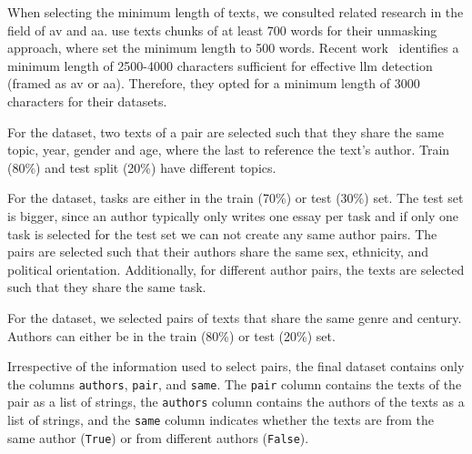 When selecting the minimum length of texts, we consulted related research in the field of \ac{av} and \ac{aa}.
\citet{bevendorff_generalizing_2019} use texts chunks of at least 700 words for their unmasking approach, 
where \citet{koppel_authorship_2004} set the minimum length to 500 words.
Recent work~\citep{llm_detection_av_2025} identifies a minimum length of \num{2500}-\num{4000} characters 
sufficient for effective \ac{llm} detection (framed as \ac{av} or \ac{aa}).
Therefore, they opted for a minimum length of \num{3000} characters for their datasets.

\begin{table}[h]
\centering\small
\caption{Statistics of preprocessed datasets \dataPan{}, \dataBlog{}, \dataGutenberg{}, and \dataStudent{}.}
\label{tab:data_stats}
\end{table}

For the \dataBlog{} dataset, 
two texts of a pair are selected such that they share the same topic, year, gender and age, where the last to reference the text's author.
Train (80\%) and test split (20\%) have different topics.

For the \dataStudent{} dataset,
tasks are either in the train (70\%) or test (30\%) set.
The test set is bigger, since an author typically only writes one essay per task and if only one task is selected for the test set we can not create any same author pairs.
The pairs are selected such that their authors share the same sex, ethnicity, and political orientation.
Additionally, for different author pairs, the texts are selected such that they share the same task.

For the \dataGutenberg{} dataset,
we selected pairs of texts that share the same genre and century.
Authors can either be in the train (80\%) or test (20\%) set.

Irrespective of the information used to select pairs, the final dataset contains only the columns \texttt{authors}, \texttt{pair}, and \texttt{same}.
The \texttt{pair} column contains the texts of the pair as a list of strings,
the \texttt{authors} column contains the authors of the texts as a list of strings,
and the \texttt{same} column indicates whether the texts are from the same author (\texttt{True}) or from different authors (\texttt{False}).
